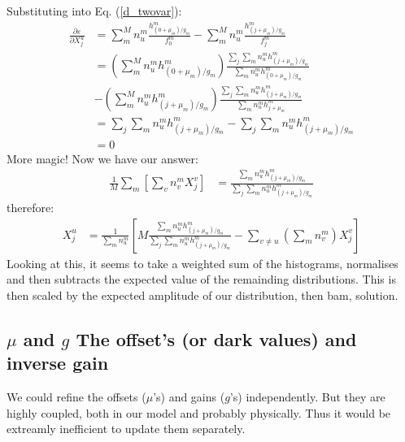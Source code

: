 \documentclass[11pt]{article}
\begin{document}
Substituting into Eq. (\ref{d_twovar}):
\begin{align}
   \frac{\partial \varepsilon}{\partial X^u_j} &= \sum_m^M n^m_u \frac{ h^m_{(0+\mu_m)/g_m}}{f^m_0}- \sum_m^M n^m_u \frac{ h^m_{(j+\mu_m)/g_m}}{f^m_j} \\
   &=  \left(\sum_m^M n^m_u h^m_{(0+\mu_m)/g_m}\right) \frac{\sum_{j}\sum_m n^m_u h^m_{(j+\mu_m)/g_m}}{\sum_m n^m_u h^m_{(0+\mu_m)/g_m}} \\
   & - \left(\sum_m^M n^m_u h^m_{(j+\mu_m)/g_m}\right) \frac{\sum_{j}\sum_m n^m_u h^m_{(j+\mu_m)/g_m}}{\sum_m n^m_u h^m_{j+\mu_m}} \\
   &= \sum_{j}\sum_m n^m_u h^m_{(j+\mu_m)/g_m} - \sum_{j}\sum_m n^m_u h^m_{(j+\mu_m)/g_m} \\
   &= 0
\end{align}
More magic! Now we have our answer:
\begin{align}
   \frac{1}{M}\sum_m \left[ \sum_v n^m_v X^v_j \right] &= \frac{\sum_m n^m_u h^m_{(j+\mu_m)/g_m}}{\sum_{j}\sum_m n^m_u h^m_{(j+\mu_m)/g_m}}
\end{align}
therefore:
\begin{align}
   X^u_j &= \frac{1}{\sum_m n^m_u}\left[M\frac{\sum_m n^m_u h^m_{(j+\mu_m)/g_m}}{\sum_{j}\sum_m n^m_u h^m_{(j+\mu_m)/g_m}} - \sum_{v\neq u} (\sum_m n^m_v) X^v_j \right] 
\end{align}
Looking at this, it seems to take a weighted sum of the histograms, normalises and then subtracts the expected value of the remainding distributions. This is then scaled by the expected amplitude of our distribution, then bam, solution.















\subsection{$\mu$ and $g$ The offset's (or dark values) and inverse gain}
We could refine the offsets ($\mu$'s) and gains ($g$'s) independently. But they are highly coupled, both in our model and probably physically. Thus it would be extreamly inefficient to update them separately.
\end{document}
